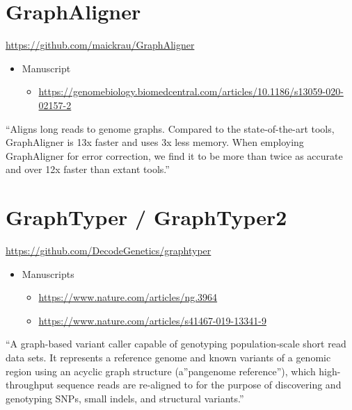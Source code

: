 \documentclass[
]{book}
\providecommand{\tightlist}{%
  \setlength{\itemsep}{0pt}\setlength{\parskip}{0pt}}
\begin{document}
\hypertarget{graphaligner}{%
\section{GraphAligner}\label{graphaligner}}

\url{https://github.com/maickrau/GraphAligner}

\begin{itemize}
\tightlist
\item
  Manuscript

  \begin{itemize}
  \tightlist
  \item
    \url{https://genomebiology.biomedcentral.com/articles/10.1186/s13059-020-02157-2}
  \end{itemize}
\end{itemize}

``Aligns long reads to genome graphs. Compared to the state-of-the-art tools, GraphAligner is 13x faster and uses 3x less memory. When employing GraphAligner for error correction, we find it to be more than twice as accurate and over 12x faster than extant tools.''

\hypertarget{graphtyper-graphtyper2}{%
\section{GraphTyper / GraphTyper2}\label{graphtyper-graphtyper2}}

\url{https://github.com/DecodeGenetics/graphtyper}

\begin{itemize}
\tightlist
\item
  Manuscripts

  \begin{itemize}
  \tightlist
  \item
    \url{https://www.nature.com/articles/ng.3964}
  \item
    \url{https://www.nature.com/articles/s41467-019-13341-9}
  \end{itemize}
\end{itemize}

``A graph-based variant caller capable of genotyping population-scale short read data sets. It represents a reference genome and known variants of a genomic region using an acyclic graph structure (a''pangenome reference''), which high-throughput sequence reads are re-aligned to for the purpose of discovering and genotyping SNPs, small indels, and structural variants.''
\end{document}
